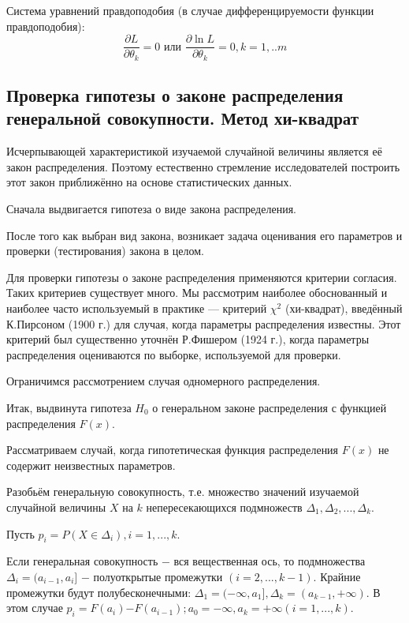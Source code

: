 Система уравнений правдоподобия (в случае дифференцируемости функции правдоподобия):
\begin{equation}
	\frac{\partial L}{\partial \theta_{k}} = 0 \text{  или  } \frac{\partial \ln L}{\partial \theta_{k}} = 0, k = 1,..m
\end{equation}

\subsection{Проверка гипотезы о законе распределения генеральной совокупности. Метод хи-квадрат}
\noindent Исчерпывающей характеристикой изучаемой случайной величины является её закон распределения. Поэтому естественно стремление исследователей построить этот закон приближённо на основе статистических данных.

Сначала выдвигается гипотеза о виде закона распределения.

После того как выбран вид закона, возникает задача оценивания его параметров и проверки (тестирования) закона в целом.

Для проверки гипотезы о законе распределения применяются критерии согласия. Таких критериев существует много. Мы рассмотрим наиболее обоснованный и наиболее часто используемый в практике — критерий $\chi^{2}$ (хи-квадрат), введённый К.Пирсоном (1900 г.) для случая, когда параметры распределения известны. Этот критерий был существенно уточнён Р.Фишером (1924 г.), когда параметры распределения оцениваются по выборке, используемой для проверки.

Ограничимся рассмотрением случая одномерного распределения.

Итак, выдвинута гипотеза $H_{0}$ о генеральном законе распределения с функцией распределения $F(x)$.

Рассматриваем случай, когда гипотетическая функция распределения $F(x)$ не содержит неизвестных параметров.

Разобьём генеральную совокупность, т.е. множество значений изучаемой случайной величины $X$ на $k$ непересекающихся подмножеств $\Delta_{1},\Delta_{2}, ... ,\Delta_{k}$.

Пусть $p_{i} = P(X \in \Delta_{i}), i = 1, ... ,k$. 

Если генеральная совокупность $-$ вся вещественная ось, то подмножества $\Delta_i = (a_{i-1},a_{i}]$ $-$ полуоткрытые промежутки $(i = 2, ... ,k-1)$. Крайние промежутки будут полубесконечными: $\Delta_{1} = (-\infty,a_{1}], \Delta_{k} = (a_{k-1},+\infty).$ В этом случае $p_{i} = F(a_{i})$$-$$F(a_{i-1}); a_{0} = -\infty, a_{k} = +\infty (i = 1, ... ,k).$

